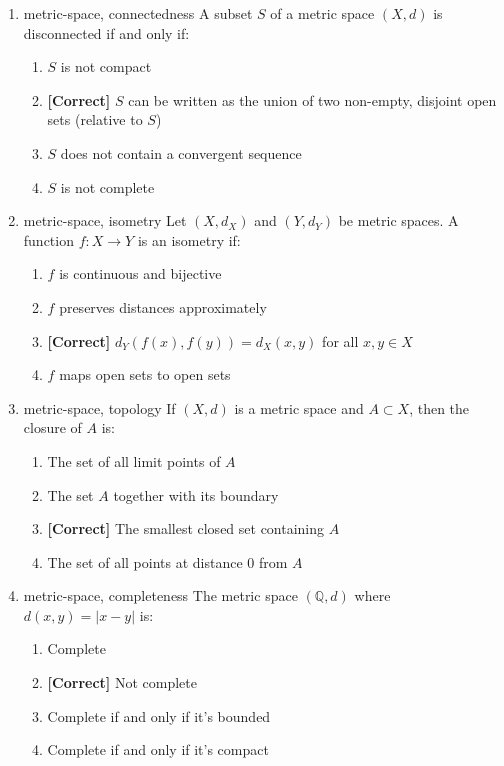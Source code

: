 \documentclass{article}
\newenvironment{problem}{\item}{}
\newcommand{\choice}{\item}
\newcommand{\correctchoice}{\item \textbf{[Correct] }}
\newcommand{\tags}[1]{#1} %
\begin{document}
\begin{enumerate}
        \begin{problem}
            \tags{metric-space, connectedness}
            A subset $S$ of a metric space $(X,d)$ is disconnected if and only if:
            \begin{enumerate}
                \choice $S$ is not compact
                \correctchoice $S$ can be written as the union of two non-empty, disjoint open sets (relative to $S$)
                \choice $S$ does not contain a convergent sequence
                \choice $S$ is not complete
            \end{enumerate}
        \end{problem}
        
        \begin{problem}
            \tags{metric-space, isometry}
            Let $(X, d_X)$ and $(Y, d_Y)$ be metric spaces. A function $f: X \to Y$ is an isometry if:
            \begin{enumerate}
                \choice $f$ is continuous and bijective
                \choice $f$ preserves distances approximately
                \correctchoice $d_Y(f(x), f(y)) = d_X(x, y)$ for all $x, y \in X$
                \choice $f$ maps open sets to open sets
            \end{enumerate}
        \end{problem}
        
        \begin{problem}
            \tags{metric-space, topology}
            If $(X, d)$ is a metric space and $A \subset X$, then the closure of $A$ is:
            \begin{enumerate}
                \choice The set of all limit points of $A$
                \choice The set $A$ together with its boundary
                \correctchoice The smallest closed set containing $A$
                \choice The set of all points at distance $0$ from $A$
            \end{enumerate}
        \end{problem}
        
        \begin{problem}
            \tags{metric-space, completeness}
            The metric space $(\mathbb{Q}, d)$ where $d(x,y) = |x-y|$ is:
            \begin{enumerate}
                \choice Complete
                \correctchoice Not complete
                \choice Complete if and only if it's bounded
                \choice Complete if and only if it's compact
            \end{enumerate}
        \end{problem}
        

\end{enumerate}
\end{document}
